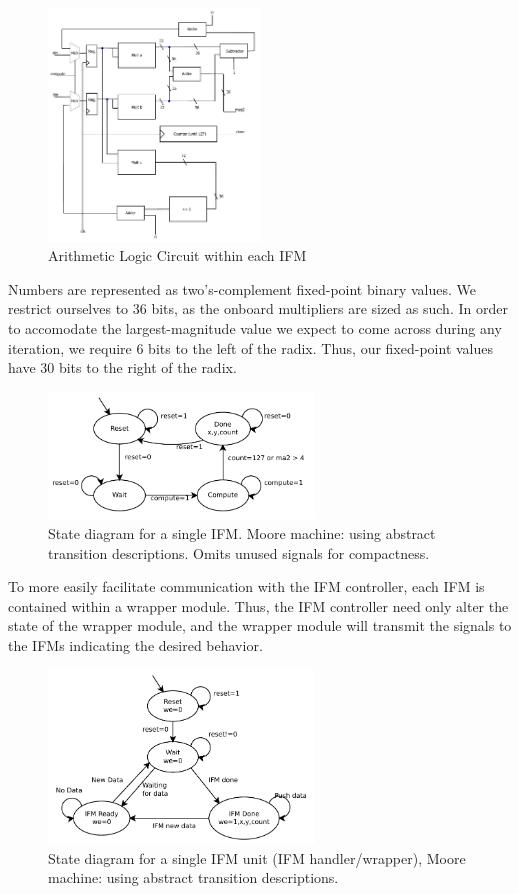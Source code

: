 \documentclass{article}
\begin{document}
\begin{figure}[H]
  \centering
    \includegraphics[width=160pt]{block_diagrams/ifm.pdf}
  \caption{Arithmetic Logic Circuit within each IFM}
\end{figure}

Numbers are represented as two's-complement fixed-point binary
values. We restrict ourselves to 36 bits, as the onboard multipliers
are sized as such. In order to accomodate the largest-magnitude value we
expect to come across during any iteration, we require 6 bits to the
left of the radix. Thus, our fixed-point values have 30 bits to the
right of the radix.

\begin{figure}[H]
  \centering
    \includegraphics[width=200pt]{state_diagrams/ifm.pdf}
  \caption{State diagram for a single IFM. Moore
    machine: using abstract transition descriptions. Omits unused
    signals for compactness.}
\end{figure}


To more easily facilitate communication with the IFM controller, each
IFM is contained within a wrapper module.  Thus, the IFM controller
need only alter the state of the wrapper module, and the wrapper
module will transmit the signals to the IFMs indicating the desired
behavior.

\begin{figure}[H]
  \centering
    \includegraphics[width=200pt]{state_diagrams/ifmunit.pdf}
  \caption{State diagram for a single IFM unit (IFM handler/wrapper),
    Moore machine: using abstract transition descriptions.}
\end{figure}
\end{document}
